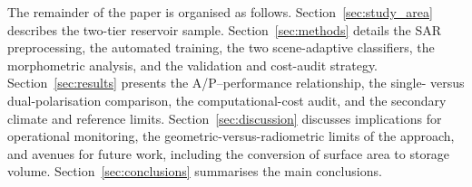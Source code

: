 The remainder of the paper is organised as follows.
Section~\ref{sec:study_area} describes the two-tier reservoir sample.
Section~\ref{sec:methods} details the SAR preprocessing, the automated
training, the two scene-adaptive classifiers, the morphometric analysis, and
the validation and cost-audit strategy. Section~\ref{sec:results} presents the
A/P--performance relationship, the single- versus dual-polarisation
comparison, the computational-cost audit, and the secondary climate and
reference limits.
Section~\ref{sec:discussion} discusses implications for operational monitoring,
the geometric-versus-radiometric limits of the approach, and avenues for
future work, including the conversion of surface area to storage volume.
Section~\ref{sec:conclusions} summarises the main conclusions.
